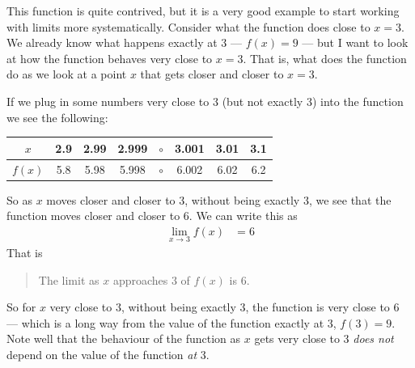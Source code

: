 \begin{eg}
This function is quite contrived, but it is a very good example to start
working with limits more systematically. Consider what the function does close
to $x=3$. We already know what happens exactly at $3$ --- $f(x)=9$ --- but I
want to look at how the function behaves very close to $x=3$. That is, what
does the function do as we look at a point $x$ that gets closer and closer to
$x=3$.

If we plug in some numbers very close to $3$ (but not exactly 3) into the
function we see the following:
\begin{center}
 \begin{tabular}{|c||c|c|c|c|c|c|c|}
  \hline
  $x$ & 2.9 & 2.99 & 2.999 & $\circ$ & 3.001 & 3.01 & 3.1\\
\hline
  $f(x)$ & 5.8 & 5.98 & 5.998 & $\circ$ & 6.002 & 6.02 & 6.2\\
\hline
 \end{tabular}
\end{center}
So as $x$ moves closer and closer to 3, without being exactly 3, we see that
the function moves closer and closer to 6. We can write this as
\begin{align*}
  \lim_{x \to 3} f(x) &= 6
\end{align*}
That is
\begin{quote}
 The limit as $x$ approaches $3$ of $f(x)$ is $6$.
\end{quote}
So for $x$ very close to $3$, without being exactly 3, the function is very close to $6$
--- which is a long way from the value of the function exactly at $3$, $f(3)=9$. Note
well that the behaviour of the function as $x$ gets very close to 3 \emph{does not}
depend on the value of the function \emph{at} 3.
\end{eg}

